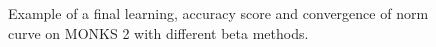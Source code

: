\begin{appendices}
\begin{figure}[H]
\begin{subfigure}{0.40\textwidth}
                \end{subfigure}
                \begin{subfigure}{0.40\textwidth}
                    \caption{}
                    \label{fig:monks_2_NORM_CGD}
                \end{subfigure}
                \caption{Example of a final learning, accuracy score and convergence of norm curve on MONKS 2 with different beta methods.}
                \label{fig:monks_2_CGD}
            \end{figure}


\end{appendices}
